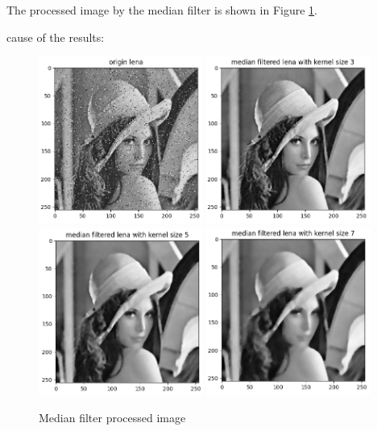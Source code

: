 \problem{}
The processed image by the median filter is shown in Figure \ref{fig:p3a}.


cause of the results:





\begin{figure}[htbp]
    \centering
	\includegraphics[width=0.48\textwidth]{../images/p3/p3_noisy.png}
	\includegraphics[width=0.48\textwidth]{../images/p3/p3a_3x3.png}
	\includegraphics[width=0.48\textwidth]{../images/p3/p3a_5x5.png}
	\includegraphics[width=0.48\textwidth]{../images/p3/p3a_7x7.png}
    \caption{Median filter processed image}
\label{fig:p3a}
\end{figure}

